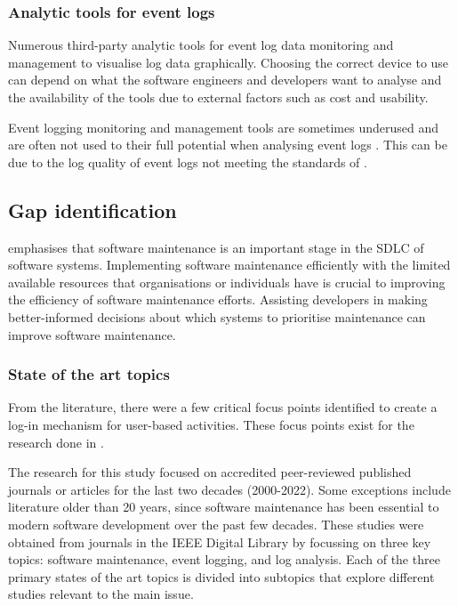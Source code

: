 \subsubsection{Analytic tools for event logs}
Numerous third-party analytic tools for event log data monitoring and management to visualise log data graphically. Choosing the correct device to use can depend on what the software engineers and developers want to analyse and the availability of the tools due to external factors such as cost and usability. \par Event logging monitoring and management tools are sometimes underused and are often not used to their full potential when analysing event logs \cite{Fedaghi2010}. This can be due to the log quality of event logs not meeting the standards of . 

\newcommand{\studyGap}{Implementing software maintenance efficiently with the limited available resources that organisations or individuals have is crucial to improving the efficiency of software maintenance efforts. Assisting developers in making better-informed decisions about which systems to prioritise maintenance can improve software maintenance.}

\subsection{Gap identification}\label{sec:ch1_gapIdentification}
 emphasises that software maintenance is an important stage in the SDLC of software systems. \studyGap

\subsubsection{State of the art topics}
From the literature, there were a few critical focus points identified to create a log-in mechanism for user-based activities. These focus points exist for the research done in .\par The research for this study focused on accredited peer-reviewed published journals or articles for the last two decades (2000-2022). Some exceptions include literature older than 20 years, since software maintenance has been essential to modern software development over the past few decades. These studies were obtained from journals in the IEEE Digital Library by focussing on three key topics: software maintenance, event logging, and log analysis. Each of the three primary states of the art topics is divided into subtopics that explore different studies relevant to the main issue.

